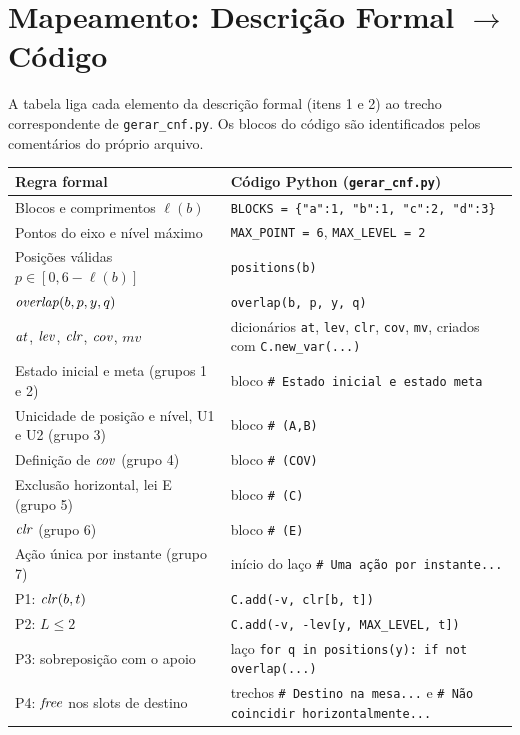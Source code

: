 \section{Mapeamento: Descrição Formal $\to$ Código}

A tabela liga cada elemento da descrição formal (itens 1 e 2) ao trecho correspondente de \texttt{gerar\_cnf.py}. Os blocos do código são identificados pelos comentários do próprio arquivo.

\begin{longtable}{p{5.2cm} p{9.6cm}}
\toprule
Regra formal & Código Python (\texttt{gerar\_cnf.py}) \\
\midrule \endhead
Blocos e comprimentos $\ell(b)$ & \lstinline|BLOCKS = {"a":1, "b":1, "c":2, "d":3}| \\
Pontos do eixo e nível máximo & \lstinline|MAX_POINT = 6|, \lstinline|MAX_LEVEL = 2| \\
Posições válidas $p\in[0,6-\ell(b)]$ & \lstinline|positions(b)| \\
$\mathit{overlap}(b,p,y,q)$ & \lstinline|overlap(b, p, y, q)| \\
$\mathit{at}$, $\mathit{lev}$, $\mathit{clr}$, $\mathit{cov}$, $\mathit{mv}$ & dicionários \lstinline|at|, \lstinline|lev|, \lstinline|clr|, \lstinline|cov|, \lstinline|mv|, criados com \lstinline|C.new_var(...)| \\
Estado inicial e meta (grupos 1 e 2) & bloco \lstinline|# Estado inicial e estado meta| \\
Unicidade de posição e nível, U1 e U2 (grupo 3) & bloco \lstinline|# (A,B)| \\
Definição de $\mathit{cov}$ (grupo 4) & bloco \lstinline|# (COV)| \\
Exclusão horizontal, lei E (grupo 5) & bloco \lstinline|# (C)| \\
$\mathit{clr}$ (grupo 6) & bloco \lstinline|# (E)| \\
Ação única por instante (grupo 7) & início do laço \texttt{\# Uma a\c{c}\~ao por instante...} \\
P1: $\mathit{clr}(b,t)$ & \lstinline|C.add(-v, clr[b, t])| \\
P2: $L\le 2$ & \lstinline|C.add(-v, -lev[y, MAX_LEVEL, t])| \\
P3: sobreposição com o apoio & laço \lstinline|for q in positions(y): if not overlap(...)| \\
P4: $\mathit{free}$ nos slots de destino & trechos \lstinline|# Destino na mesa...| e \texttt{\# N\~ao coincidir horizontalmente...} \\

\end{longtable}
